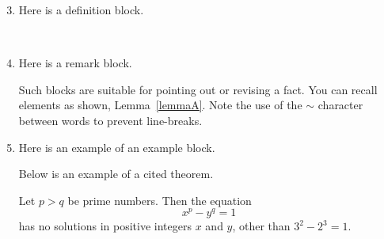 \begin{frame}
\begin{enumerate}
\setcounter{enumi}{2}
\item Here is a definition block.

\begin{definition}\label{definition}
{\gray \lipsum[3][1-7]}
\end{definition}

~\ %

\item Here is a remark block.
\begin{remark}
Such blocks are suitable for \alert{pointing out or revising a fact}. You can recall elements as shown, Lemma~\ref{lemmaA}. Note the use of the $\sim$ character between words to prevent line-breaks.
\end{remark}
\end{enumerate}
\end{frame}

\begin{frame}
\begin{enumerate}
\setcounter{enumi}{4}
\item Here is an example of an example block.
\begin{example}
    Below is an example of a cited theorem. %
\end{example}
\begin{theorem}
\label{CMT}
Let $p>q$ be prime numbers. Then the equation
\begin{equation}
    x^p -y^q = 1
\end{equation}
has no solutions in positive integers $x$ and $y$, other than $3^2 -2^3 = 1$.
\end{theorem}
\end{enumerate}
\end{frame}

